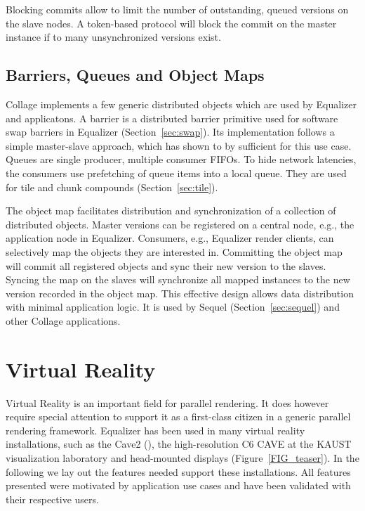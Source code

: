 \documentclass[10pt,journal,compsoc]{IEEEtran}
\newcommand{\sref}[1]{Section~\ref{#1}}
\newcommand{\fig}[1]{Figure~\ref{#1}}
\begin{document}
Blocking commits allow to limit the number of outstanding, queued versions on
the slave nodes. A token-based protocol will block the commit on the master
instance if to many unsynchronized versions exist.

\subsection{Barriers, Queues and Object Maps}

Collage implements a few generic distributed objects which are used by Equalizer
and applicatons. A barrier is a distributed barrier primitive used for software
swap barriers in Equalizer (\sref{sec:swap}). Its implementation follows a
simple master-slave approach, which has shown to by sufficient for this use
case. Queues are single producer, multiple consumer FIFOs. To hide network
latencies, the consumers use prefetching of queue items into a local queue. They
are used for tile and chunk compounds (\sref{sec:tile}).

The object map facilitates distribution and synchronization of a collection of
distributed objects. Master versions can be registered on a central node, e.g.,
the application node in Equalizer. Consumers, e.g., Equalizer render clients,
can selectively map the objects they are interested in. Committing the object
map will commit all registered objects and sync their new version to the
slaves. Syncing the map on the slaves will synchronize all mapped instances to
the new version recorded in the object map. This effective design allows data
distribution with minimal application logic. It is used by Sequel
(\sref{sec:sequel}) and other Collage applications.

\section{Virtual Reality}

Virtual Reality is an important field for parallel rendering. It does however
require special attention to support it as a first-class citizen in a generic
parallel rendering framework. Equalizer has been used in many virtual reality
installations, such as the Cave2 (\cite{FNTTL:13}), the high-resolution C6 CAVE
at the KAUST visualization laboratory and head-mounted displays
(\fig{FIG_teaser}). In the following we lay out the features needed support
these installations. All features presented were motivated by application use
cases and have been validated with their respective users.
\end{document}
